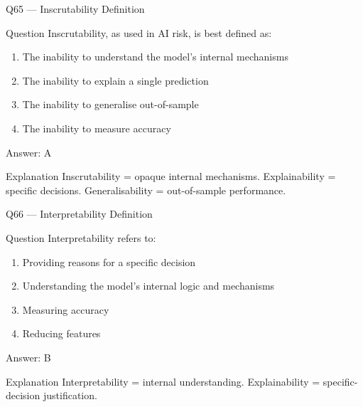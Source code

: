 \documentclass[aspectratio=169,8pt]{beamer}
\begin{document}
	\begin{frame}{Q65 --- Inscrutability Definition}
		\begin{block}{Question}
			Inscrutability, as used in AI risk, is best defined as:
			\begin{enumerate}
				\item The inability to understand the model's internal mechanisms
				\item The inability to explain a single prediction
				\item The inability to generalise out-of-sample
				\item The inability to measure accuracy
			\end{enumerate}
		\end{block}
		\begin{exampleblock}{Answer: A}\end{exampleblock}
		\begin{block}{Explanation}
			Inscrutability = opaque internal mechanisms. Explainability = specific decisions. Generalisability = out-of-sample performance.
		\end{block}
	\end{frame}
	
	\begin{frame}{Q66 --- Interpretability Definition}
		\begin{block}{Question}
			Interpretability refers to:
			\begin{enumerate}
				\item Providing reasons for a specific decision
				\item Understanding the model's internal logic and mechanisms
				\item Measuring accuracy
				\item Reducing features
			\end{enumerate}
		\end{block}
		\begin{exampleblock}{Answer: B}\end{exampleblock}
		\begin{block}{Explanation}
			Interpretability = internal understanding. Explainability = specific-decision justification.
		\end{block}
	\end{frame}
	
\end{document}
